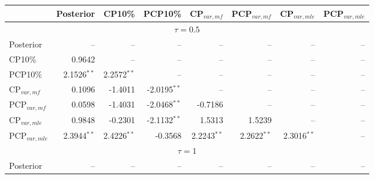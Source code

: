 { \renewcommand{\arraystretch}{1.2} 
 {\footnotesize 
\begin{table} 
\center 
\begin{tabular}{l | rrrrrrr} 
& \multicolumn{1}{c}{Posterior}& \multicolumn{1}{c}{CP10\%}& \multicolumn{1}{c}{PCP10\%}& \multicolumn{1}{c}{CP$_{var,mf}$}& \multicolumn{1}{c}{PCP$_{var,mf}$}& \multicolumn{1}{c}{CP$_{var,mle}$}& \multicolumn{1}{c}{PCP$_{var,mle}$} \\ \hline 
 \multicolumn{8}{c}{$\tau = 0.5$} \\ \hline 
Posterior &    --\phantom{$^{***}$} &    --\phantom{$^{***}$} &    --\phantom{$^{***}$} &    --\phantom{$^{***}$} &    --\phantom{$^{***}$} &    --\phantom{$^{***}$} &    --\phantom{$^{***}$}   \\ 
CP10\% & 0.9642\phantom{$^{***}$} &    --\phantom{$^{***}$} &    --\phantom{$^{***}$} &    --\phantom{$^{***}$} &    --\phantom{$^{***}$} &    --\phantom{$^{***}$} &    --\phantom{$^{***}$}   \\ 
PCP10\% & 2.1526$^{**}$\phantom{$^{*}$} & 2.2572$^{**}$\phantom{$^{*}$} &    --\phantom{$^{***}$} &    --\phantom{$^{***}$} &    --\phantom{$^{***}$} &    --\phantom{$^{***}$} &    --\phantom{$^{***}$}   \\ 
CP$_{var,mf}$ & 0.1096\phantom{$^{***}$} & -1.4011\phantom{$^{***}$} & -2.0195$^{**}$\phantom{$^{*}$} &    --\phantom{$^{***}$} &    --\phantom{$^{***}$} &    --\phantom{$^{***}$} &    --\phantom{$^{***}$}   \\ 
PCP$_{var,mf}$ & 0.0598\phantom{$^{***}$} & -1.4031\phantom{$^{***}$} & -2.0468$^{**}$\phantom{$^{*}$} & -0.7186\phantom{$^{***}$} &    --\phantom{$^{***}$} &    --\phantom{$^{***}$} &    --\phantom{$^{***}$}   \\ 
CP$_{var,mle}$ & 0.9848\phantom{$^{***}$} & -0.2301\phantom{$^{***}$} & -2.1132$^{**}$\phantom{$^{*}$} & 1.5313\phantom{$^{***}$} & 1.5239\phantom{$^{***}$} &    --\phantom{$^{***}$} &    --\phantom{$^{***}$}   \\ 
PCP$_{var,mle}$ & 2.3944$^{**}$\phantom{$^{*}$} & 2.4226$^{**}$\phantom{$^{*}$} & -0.3568\phantom{$^{***}$} & 2.2243$^{**}$\phantom{$^{*}$} & 2.2622$^{**}$\phantom{$^{*}$} & 2.3016$^{**}$\phantom{$^{*}$} &    --\phantom{$^{***}$}   \\ 
\hline 
%
%
\multicolumn{8}{c}{$\tau = 1$} \\ \hline 
Posterior &    --\phantom{$^{***}$} &    --\phantom{$^{***}$} &    --\phantom{$^{***}$} &    --\phantom{$^{***}$} &    --\phantom{$^{***}$} &    --\phantom{$^{***}$} &    --\phantom{$^{***}$}   \\ 

\end{tabular}
\end{table}}}
